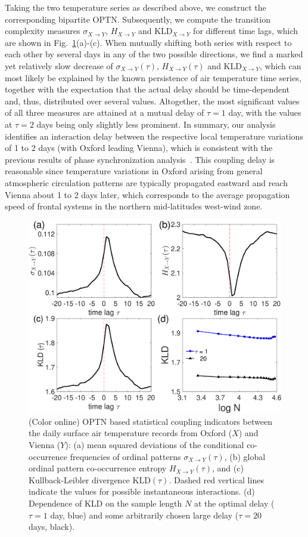 \documentclass[12pt,aip,cha,reprint,nofootinbib]{revtex4-1}
\begin{document}
Taking the two temperature series as described above, we construct the corresponding bipartite OPTN. Subsequently, we compute the transition complexity measures $\sigma_{X\to Y}$, $H_{X\to Y}$ and $\text{KLD}_{X\to Y}$ for different time lags, which are shown in Fig.~\ref{fig:stdHeqTemp}(a)-(c). When mutually shifting both series with respect to each other by several days in any of the two possible directions, we find a marked yet relatively slow decrease of $\sigma_{X\to Y} (\tau)$, $H_{X\to Y} (\tau)$ and $\text{KLD}_{X\to Y}$, which can most likely be explained by the known persistence of air temperature time series, together with the expectation that the actual delay should be time-dependent and, thus, distributed over several values. Altogether, the most significant values of all three measures are attained at a mutual delay of $\tau=1$ day, with the values at $\tau=2$ days being only slightly less prominent. In summary, our analysis identifies an interaction delay between the respective local temperature variations of 1 to 2 days (with Oxford leading Vienna), which is consistent with the previous results of phase synchronization analysis~\cite{Rybski2003}. This coupling delay is reasonable since temperature variations in Oxford arising from general atmospheric circulation patterns are typically propagated eastward and reach Vienna about 1 to 2 days later, which corresponds to the average propagation speed of frontal systems in the northern mid-latitudes west-wind zone. 

\begin{figure}
	\centering
	\includegraphics[width=\columnwidth]{E_temperature.eps}
\caption{(Color online) OPTN based statistical coupling indicators between the daily surface air temperature records from Oxford ($X$) and Vienna ($Y$): (a) mean squared deviations of the conditional co-occurrence frequencies of ordinal patterns $\sigma_{X\to Y} (\tau)$, (b) global ordinal pattern co-occurrence entropy $H_{X\to Y}(\tau)$, and (c) Kullback-Leibler divergence $\text{KLD}(\tau)$. Dashed red vertical lines indicate the values for possible instantaneous interactions. (d) Dependence of KLD on the sample length $N$ at the optimal delay ($\tau=1$ day, blue) and some arbitrarily chosen large delay ($\tau=20$ days, black). 
\label{fig:stdHeqTemp}}
\end{figure}
\end{document}
